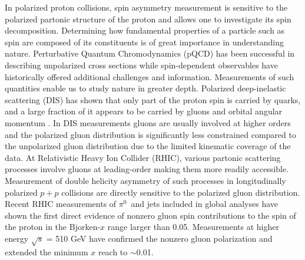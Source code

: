 \documentclass[twocolumn,letterpaper,aps,prl,longbibliography,superscriptaddress,floatfix]{revtex4-2}
\newcommand{\pizero}{\ensuremath{\pi^0}}
\begin{document}
In polarized proton collisions, spin asymmetry measurement is sensitive to the polarized partonic structure of the proton and allows one to investigate its spin decomposition. Determining how fundamental properties of a particle such as spin are composed of its constituents is of great importance in understanding nature. Perturbative Quantum Chromodynamics (pQCD) has been successful in describing unpolarized cross sections while spin-dependent observables have historically offered additional challenges and information. Measurements of such quantities enable us to study nature in greater depth. Polarized deep-inelastic scattering (DIS) has shown that only part of the proton spin is carried by quarks, and a large fraction of it appears to be carried by gluons and orbital angular momentum \cite{1988364, ALEXAKHIN20078}. In DIS measurements gluons are usually involved at higher orders and the polarized gluon distribution is significantly less constrained compared to the unpolarized gluon distribution due to the limited kinematic coverage of the data. At Relativistic Heavy Ion Collider (RHIC), various partonic scattering processes involve gluons at leading-order making them more readily accessible. Measurement of double helicity asymmetry of such processes in longitudinally polarized $p+p$ collisions are directly sensitive to the polarized gluon distribution. Recent RHIC measurements of \pizero\ and jets \cite{PhysRevD.90.012007, PhysRevLett.103.012003, PhysRevD.79.012003, PhysRevD.86.032006, PhysRevLett.115.092002} included in global analyses have shown the first direct evidence of nonzero gluon spin contributions to the spin of the proton \cite{PhysRevLett.113.012001} in the Bjorken-$x$ range larger than 0.05. Measurements at higher energy $\sqrt{s}$ = 510 GeV \cite{PhysRevD.93.011501, PhysRevD.100.052005} have confirmed the nonzero gluon polarization and extended the minimum $x$ reach to $\sim$0.01.
\end{document}
